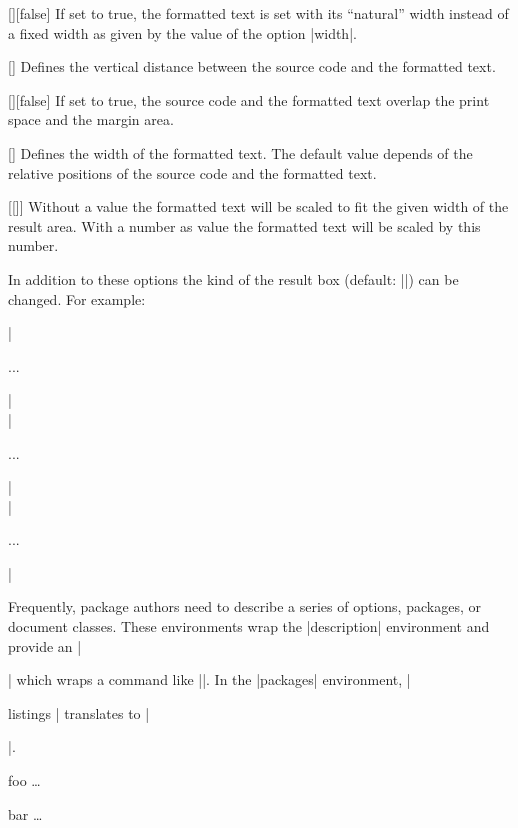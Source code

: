 \documentclass{ltxguidex}
\begin{document}
\begin{keys}
	[\bool][false]
	If set to true, the formatted text is set with its ``natural'' width
	instead of a fixed width as given by the value of the option
	|width|.

	[]
	Defines the vertical distance between the source code and the
	formatted text.

	[\bool][false]
	If set to true, the source code and the formatted text overlap the
	print space and the margin area.

	[]
	Defines the width of the formatted text. The default value depends
	of the relative positions of the source code and the formatted text.

	[[]]
	Without a value the formatted text will be scaled to fit the given
	width of the result area. With a number as value the formatted text
	will be scaled by this number.
\end{keys}

In addition to these options the kind of the result box (default: |\fbox|)
can be changed. For example:
\begin{latexcode}
\renewcommand\ResultBox{\fcolorbox{green}{lightgray}}
\setlength\ResultBoxSep{5mm}%
\setlength\ResultBoxRule{2mm}%
\end{latexcode}

\begin{desc}
|\begin{packages}...\end{packages}|\\
|\begin{classes}...\end{classes}|\\
|\begin{options}...\end{options}|\\
\end{desc}

Frequently, package authors need to describe a series of options, packages,
or document classes. These environments wrap the |description| environment
and provide an |\item| which wraps a command like |\package|. In the
|packages| environment, |\item[listings]| translates to
|\item[\package{listings}]|.

\begin{LTXexample}
\begin{options}
    \item[foo] \dots
    \item[bar] \dots
\end{options}
\end{LTXexample}
\end{document}
